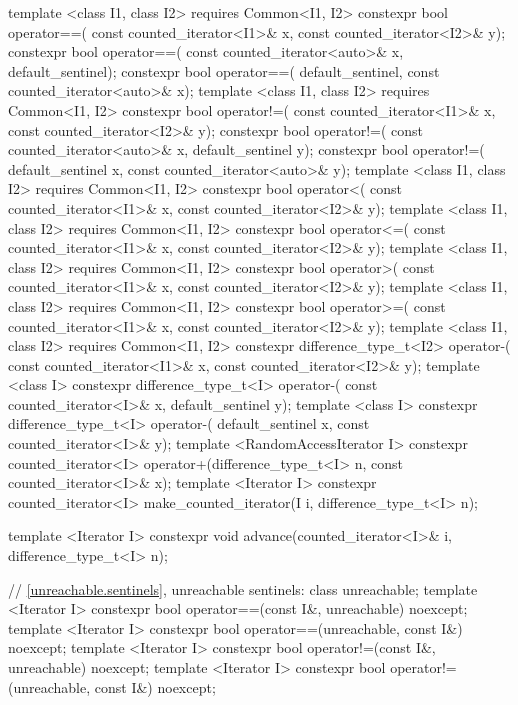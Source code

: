 \begin{codeblock}
{{{{  template <class I1, class I2>
      requires Common<I1, I2>
    constexpr bool operator==(
      const counted_iterator<I1>& x, const counted_iterator<I2>& y);
  constexpr bool operator==(
    const counted_iterator<auto>& x, default_sentinel);
  constexpr bool operator==(
    default_sentinel, const counted_iterator<auto>& x);
  template <class I1, class I2>
      requires Common<I1, I2>
    constexpr bool operator!=(
      const counted_iterator<I1>& x, const counted_iterator<I2>& y);
  constexpr bool operator!=(
    const counted_iterator<auto>& x, default_sentinel y);
  constexpr bool operator!=(
    default_sentinel x, const counted_iterator<auto>& y);
  template <class I1, class I2>
      requires Common<I1, I2>
    constexpr bool operator<(
      const counted_iterator<I1>& x, const counted_iterator<I2>& y);
  template <class I1, class I2>
      requires Common<I1, I2>
    constexpr bool operator<=(
      const counted_iterator<I1>& x, const counted_iterator<I2>& y);
  template <class I1, class I2>
      requires Common<I1, I2>
    constexpr bool operator>(
      const counted_iterator<I1>& x, const counted_iterator<I2>& y);
  template <class I1, class I2>
      requires Common<I1, I2>
    constexpr bool operator>=(
      const counted_iterator<I1>& x, const counted_iterator<I2>& y);
  template <class I1, class I2>
      requires Common<I1, I2>
    constexpr difference_type_t<I2> operator-(
      const counted_iterator<I1>& x, const counted_iterator<I2>& y);
  template <class I>
    constexpr difference_type_t<I> operator-(
      const counted_iterator<I>& x, default_sentinel y);
  template <class I>
    constexpr difference_type_t<I> operator-(
      default_sentinel x, const counted_iterator<I>& y);
  template <RandomAccessIterator I>
    constexpr counted_iterator<I>
      operator+(difference_type_t<I> n, const counted_iterator<I>& x);
  template <Iterator I>
    constexpr counted_iterator<I> make_counted_iterator(I i, difference_type_t<I> n);

  template <Iterator I>
    constexpr void advance(counted_iterator<I>& i, difference_type_t<I> n);

  // \ref{unreachable.sentinels}, unreachable sentinels:
  class unreachable;
  template <Iterator I>
    constexpr bool operator==(const I&, unreachable) noexcept;
  template <Iterator I>
    constexpr bool operator==(unreachable, const I&) noexcept;
  template <Iterator I>
    constexpr bool operator!=(const I&, unreachable) noexcept;
  template <Iterator I>
    constexpr bool operator!=(unreachable, const I&) noexcept;

}}}}
\end{codeblock}
